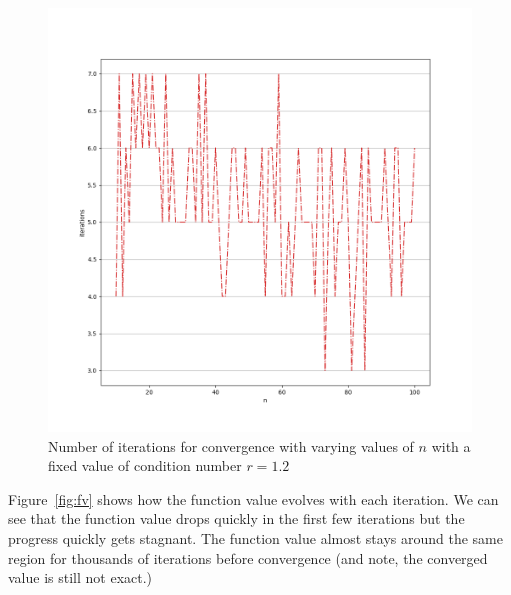 \documentclass[11pt]{article}
\begin{document}
\begin{figure}[!htbp]
    \includegraphics[width=\textwidth]{./niter_fix_r_good.png}
    \caption{Number of iterations for convergence with varying values of $n$
    with a fixed value of condition number $r=1.2$\label{fig:good}}
\end{figure}
Figure~\ref{fig:fv} shows how the function value evolves with each iteration.
We can see that the function value drops quickly in the first few iterations but
the progress quickly gets stagnant. The function value almost stays around the same
region for thousands of iterations before convergence (and note, the converged
value is still not exact.)
\end{document}
